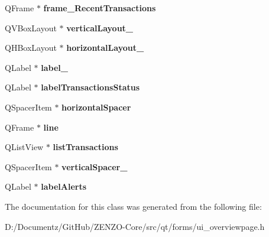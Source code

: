\begin{DoxyCompactItemize}
Q\+Frame $\ast$ {\bfseries frame\+\_\+\+Recent\+Transactions}
\item 
\mbox{\label{class_ui___overview_page_a554c090107d2a670a29a291091066f0b}} 
Q\+V\+Box\+Layout $\ast$ {\bfseries vertical\+Layout\+\_}
\item 
\mbox{\label{class_ui___overview_page_ac6bad79214477e8236b3a0530f20009d}} 
Q\+H\+Box\+Layout $\ast$ {\bfseries horizontal\+Layout\+\_}
\item 
\mbox{\label{class_ui___overview_page_ac22cc2946b1b3d33a13b27c015b4e747}} 
Q\+Label $\ast$ {\bfseries label\+\_}
\item 
\mbox{\label{class_ui___overview_page_a0c3d659d82f822a03e874784c53f15e8}} 
Q\+Label $\ast$ {\bfseries label\+Transactions\+Status}
\item 
\mbox{\label{class_ui___overview_page_a66bac48a57bde66251ec501548650b1e}} 
Q\+Spacer\+Item $\ast$ {\bfseries horizontal\+Spacer}
\item 
\mbox{\label{class_ui___overview_page_a2ed0418efcc313cd393249bf7f6dac25}} 
Q\+Frame $\ast$ {\bfseries line}
\item 
\mbox{\label{class_ui___overview_page_ac209c14dae4ffd99d7e224ea016f2459}} 
Q\+List\+View $\ast$ {\bfseries list\+Transactions}
\item 
\mbox{\label{class_ui___overview_page_a377e20a7386fffcf76c84b129c4926a6}} 
Q\+Spacer\+Item $\ast$ {\bfseries vertical\+Spacer\+\_}
\item 
\mbox{\label{class_ui___overview_page_a08bc3b2949f7bdc34170a236b1cafc74}} 
Q\+Label $\ast$ {\bfseries label\+Alerts}
\end{DoxyCompactItemize}


The documentation for this class was generated from the following file\+:\begin{DoxyCompactItemize}
\item 
D\+:/\+Documentz/\+Git\+Hub/\+Z\+E\+N\+Z\+O-\/\+Core/src/qt/forms/ui\+\_\+overviewpage.\+h\end{DoxyCompactItemize}
